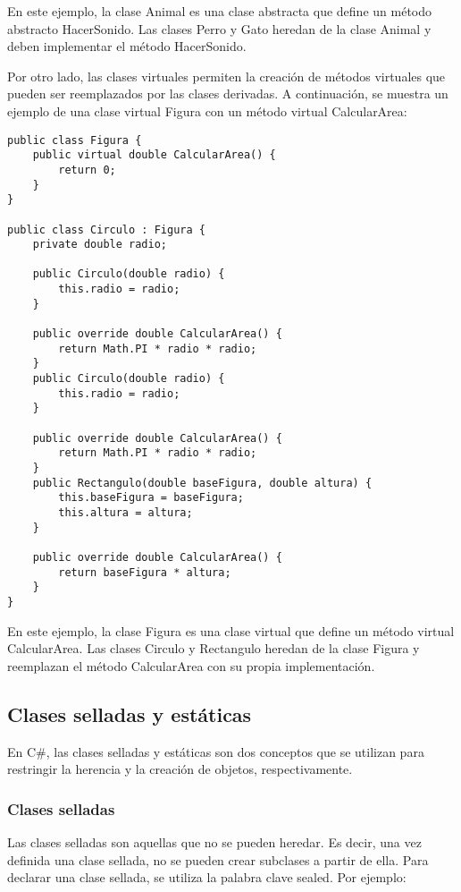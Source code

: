 \documentclass[executivepaper]{article}
\begin{document}
En este ejemplo, la clase Animal es una clase abstracta que define un método abstracto HacerSonido. Las clases Perro y Gato heredan de la clase Animal y deben implementar el método HacerSonido.

Por otro lado, las clases virtuales permiten la creación de métodos virtuales que pueden ser reemplazados por las clases derivadas. A continuación, se muestra un ejemplo de una clase virtual Figura con un método virtual CalcularArea:

\begin{lstlisting}
public class Figura {
    public virtual double CalcularArea() {
        return 0;
    }
}

public class Circulo : Figura {
    private double radio;

    public Circulo(double radio) {
        this.radio = radio;
    }

    public override double CalcularArea() {
        return Math.PI * radio * radio;
    }
    public Circulo(double radio) {
        this.radio = radio;
    }

    public override double CalcularArea() {
        return Math.PI * radio * radio;
    }
    public Rectangulo(double baseFigura, double altura) {
        this.baseFigura = baseFigura;
        this.altura = altura;
    }

    public override double CalcularArea() {
        return baseFigura * altura;
    }
}
\end{lstlisting}

En este ejemplo, la clase Figura es una clase virtual que define un método virtual CalcularArea. Las clases Circulo y Rectangulo heredan de la clase Figura y reemplazan el método CalcularArea con su propia implementación.

\subsection{Clases selladas y estáticas}

En C\#, las clases selladas y estáticas son dos conceptos que se utilizan para restringir la herencia y la creación de objetos, respectivamente.

\subsubsection{Clases selladas}

Las clases selladas son aquellas que no se pueden heredar. Es decir, una vez definida una clase sellada, no se pueden crear subclases a partir de ella. Para declarar una clase sellada, se utiliza la palabra clave sealed. Por ejemplo:
\end{document}
